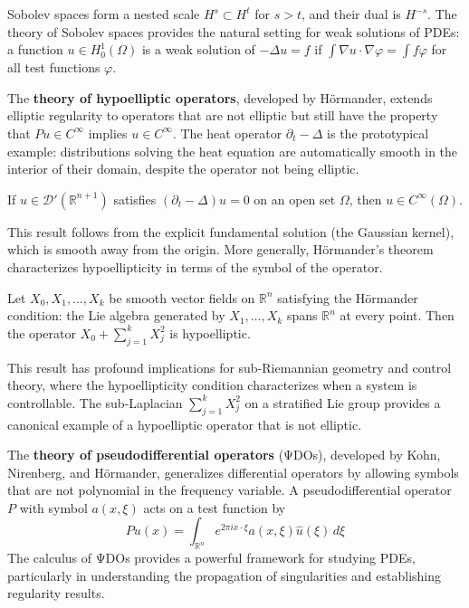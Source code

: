 Sobolev spaces form a nested scale $H^s \subset H^t$ for $s > t$, and their dual is $H^{-s}$. The theory of Sobolev spaces provides the natural setting for weak solutions of PDEs: a function $u \in H^1_0(\Omega)$ is a weak solution of $-\Delta u = f$ if $\int \nabla u \cdot \nabla \varphi = \int f \varphi$ for all test functions $\varphi$.

The \textbf{theory of hypoelliptic operators}, developed by H\"ormander, extends elliptic regularity to operators that are not elliptic but still have the property that $Pu \in C^\infty$ implies $u \in C^\infty$. The heat operator $\partial_t - \Delta$ is the prototypical example: distributions solving the heat equation are automatically smooth in the interior of their domain, despite the operator not being elliptic.

\begin{theorem}
If $u \in \mathcal{D}'(\mathbb{R}^{n+1})$ satisfies $(\partial_t - \Delta)u = 0$ on an open set $\Omega$, then $u \in C^\infty(\Omega)$.
\end{theorem}

This result follows from the explicit fundamental solution (the Gaussian kernel), which is smooth away from the origin. More generally, H\"ormander's theorem characterizes hypoellipticity in terms of the symbol of the operator.

\begin{theorem}
Let $X_0, X_1, \ldots, X_k$ be smooth vector fields on $\mathbb{R}^n$ satisfying the H\"ormander condition: the Lie algebra generated by $X_1, \ldots, X_k$ spans $\mathbb{R}^n$ at every point. Then the operator $X_0 + \sum_{j=1}^k X_j^2$ is hypoelliptic.
\end{theorem}

This result has profound implications for sub-Riemannian geometry and control theory, where the hypoellipticity condition characterizes when a system is controllable. The sub-Laplacian $\sum_{j=1}^k X_j^2$ on a stratified Lie group provides a canonical example of a hypoelliptic operator that is not elliptic.

The \textbf{theory of pseudodifferential operators} (ΨDOs), developed by Kohn, Nirenberg, and H\"ormander, generalizes differential operators by allowing symbols that are not polynomial in the frequency variable. A pseudodifferential operator $P$ with symbol $a(x,\xi)$ acts on a test function by
\[P u(x) = \int_{\mathbb{R}^n} e^{2\pi i x \cdot \xi} a(x,\xi) \hat{u}(\xi) \, d\xi\]
The calculus of ΨDOs provides a powerful framework for studying PDEs, particularly in understanding the propagation of singularities and establishing regularity results.

